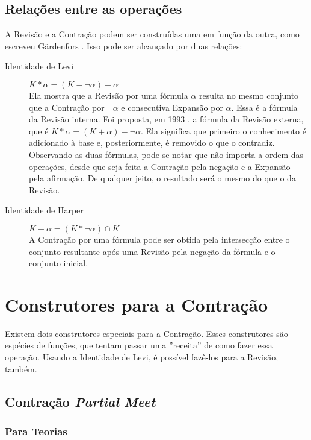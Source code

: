 \subsection{Relações entre as operações}

A Revisão e a Contração podem ser construídas uma em função da outra, como escreveu Gärdenfors \cite{revisaoGardenfors}. Isso pode ser alcançado por duas relações:

\begin{description}
	\item[Identidade de Levi] $ K \ast \alpha = (K - \lnot \alpha) + \alpha $ \\ Ela mostra que a Revisão por uma fórmula $ \alpha $ resulta no mesmo conjunto que a Con\-tra\-ção por $ \lnot \alpha $ e consecutiva Expansão por $ \alpha $. Essa é a fórmula da Revisão interna. Foi proposta, em 1993 \cite{revisaoHansson2}, a fórmula da Revisão externa, que é $ K \ast \alpha = (K + \alpha) - \lnot \alpha $. Ela significa que primeiro o conhecimento é adicionado à base e, posteriormente, é removido o que o contradiz. Observando as duas fórmulas, pode-se notar que não importa a ordem das operações, desde que seja feita a Contração pela negação e a Expansão pela afirmação. De qualquer jeito, o resultado será o mesmo do que o da Revisão.
	\item[Identidade de Harper] $ K - \alpha = (K \ast \lnot \alpha) \cap K $ \\ A Contração por uma fórmula pode ser obtida pela intersecção entre o conjunto resultante após uma Revisão pela negação da fórmula e o conjunto inicial.
\end{description}

\section{Construtores para a Contração}

Existem dois construtores especiais para a Contração. Esses construtores são espécies de funções, que tentam passar uma ''receita'' de como fazer essa operação. Usando a Identidade de Levi, é possível fazê-los para a Revisão, também.

\subsection{Contração \textit{Partial Meet}}

\subsubsection{Para Teorias}

